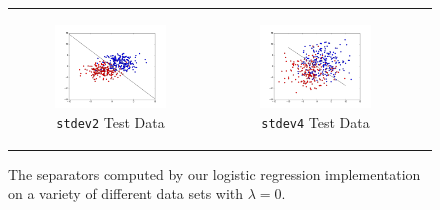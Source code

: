 \documentclass{sigchi}
\begin{document}
\begin{figure}[!ht]
\begin{tabular}{c c c}
\begin{subfigure}[b]{2.25in}
	\includegraphics[width = 2.25in]{plots/stdev2_test_plot.png}
	\caption{\texttt{stdev2} Test Data}
\end{subfigure} &

\begin{subfigure}[b]{2.25in}
	\includegraphics[width = 2.25in]{plots/stdev4_test_plot.png}
	\caption{\texttt{stdev4} Test Data}
\end{subfigure} \\
\end{tabular}
\caption{The separators computed by our logistic regression implementation on a variety of different data sets with $\lambda = 0$.}
\end{figure}
\end{document}

